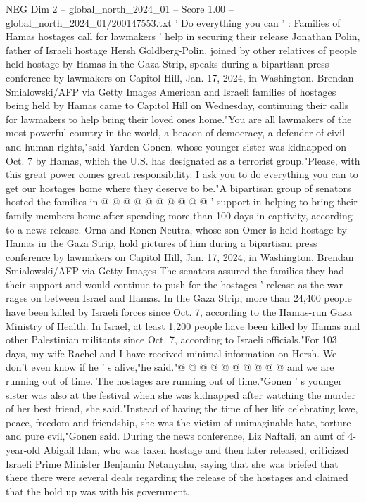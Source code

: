 \begin{textsample}{NEG Dim 2 – global\_north\_2024\_01 – Score 1.00 – global\_north\_2024\_01/200147553.txt}  \label{ex:f2_neg_242}
' Do everything you can ' : Families of Hamas hostages call for lawmakers ' help in securing their release Jonathan Polin, father of Israeli hostage Hersh Goldberg-Polin, joined by other relatives of people held hostage by Hamas in the Gaza Strip, speaks during a bipartisan press conference by lawmakers on Capitol Hill, Jan. 17, 2024, in Washington.
Brendan Smialowski/AFP via Getty Images American and Israeli families of hostages being held by Hamas came to Capitol Hill on Wednesday, continuing their calls for lawmakers to help bring their loved ones home."You are all lawmakers of the most powerful country in the world, a beacon of democracy, a defender of civil and human rights,"said Yarden Gonen, whose younger sister was kidnapped on Oct. 7 by Hamas, which the U.S. has designated as a terrorist group."Please, with this great power comes great responsibility.
I ask you to do everything you can to get our hostages home where they deserve to be."A bipartisan group of senators hosted the families in @ @ @ @ @ @ @ @ @ @ ' support in helping to bring their family members home after spending more than 100 days in captivity, according to a news release.
Orna and Ronen Neutra, whose son Omer is held hostage by Hamas in the Gaza Strip, hold pictures of him during a bipartisan press conference by lawmakers on Capitol Hill, Jan. 17, 2024, in Washington.
Brendan Smialowski/AFP via Getty Images The senators assured the families they had their support and would continue to push for the hostages ' release as the war rages on between Israel and Hamas.
In the Gaza Strip, more than 24,400 people have been killed by Israeli forces since Oct. 7, according to the Hamas-run Gaza Ministry of Health.
In Israel, at least 1,200 people have been killed by Hamas and other Palestinian militants since Oct. 7, according to Israeli officials."For 103 days, my wife Rachel and I have received minimal information on Hersh.
We don't even know if he ' s alive,"he said."@ @ @ @ @ @ @ @ @ @ and we are running out of time.
The hostages are running out of time."Gonen ' s younger sister was also at the festival when she was kidnapped after watching the murder of her best friend, she said."Instead of having the time of her life celebrating love, peace, freedom and friendship, she was the victim of unimaginable hate, torture and pure evil,"Gonen said.
During the news conference, Liz Naftali, an aunt of 4-year-old Abigail Idan, who was taken hostage and then later released, criticized Israeli Prime Minister Benjamin Netanyahu, saying that she was briefed that there there were several deals regarding the release of the hostages and claimed that the hold up was with his government.

\end{textsample}
